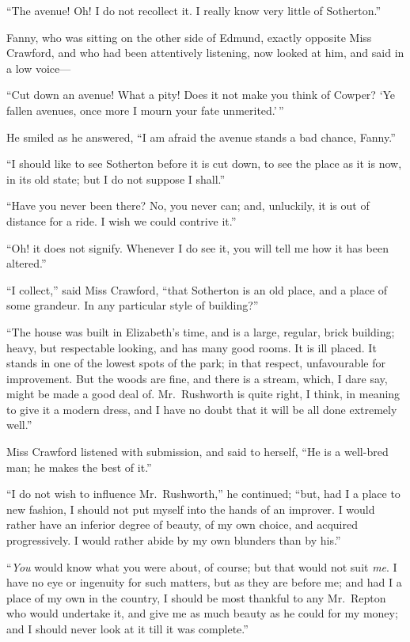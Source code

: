 \documentclass{article}
\begin{document}
``The avenue!  Oh!  I do not recollect it.  I really know
very little of Sotherton.''

Fanny, who was sitting on the other side of Edmund,
exactly opposite Miss Crawford, and who had been attentively
listening, now looked at him, and said in a low voice---%

``Cut down an avenue!  What a pity!  Does it not make you
think of Cowper?  `Ye fallen avenues, once more I mourn
your fate unmerited.'\,''

He smiled as he answered, ``I am afraid the avenue stands
a bad chance, Fanny.''

``I should like to see Sotherton before it is cut down,
to see the place as it is now, in its old state; but I do
not suppose I shall.''

``Have you never been there?  No, you never can;
and, unluckily, it is out of distance for a ride.
I wish we could contrive it.''

``Oh! it does not signify.  Whenever I do see it,
you will tell me how it has been altered.''

``I collect,'' said Miss Crawford, ``that Sotherton
is an old place, and a place of some grandeur.
In any particular style of building?''

``The house was built in Elizabeth's time, and is a large,
regular, brick building; heavy, but respectable looking,
and has many good rooms.  It is ill placed.  It stands
in one of the lowest spots of the park; in that respect,
unfavourable for improvement.  But the woods are fine,
and there is a stream, which, I dare say, might be made
a good deal of.  Mr.\ Rushworth is quite right, I think,
in meaning to give it a modern dress, and I have no doubt
that it will be all done extremely well.''

Miss Crawford listened with submission, and said to herself,
``He is a well-bred man; he makes the best of it.''

``I do not wish to influence Mr.\ Rushworth,'' he continued;
``but, had I a place to new fashion, I should not put
myself into the hands of an improver.  I would rather
have an inferior degree of beauty, of my own choice,
and acquired progressively.  I would rather abide by my own
blunders than by his.''

``\emph{You} would know what you were about, of course;
but that would not suit \emph{me}.  I have no eye or
ingenuity for such matters, but as they are before me;
and had I a place of my own in the country, I should be
most thankful to any Mr.\ Repton who would undertake it,
and give me as much beauty as he could for my money;
and I should never look at it till it was complete.''
\end{document}
